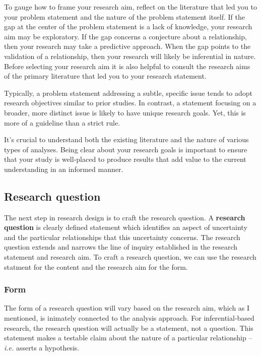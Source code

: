 \documentclass[
  letterpaper,
]{latex/krantz}
\theoremstyle{definition}
\theoremstyle{remark}
\begin{document}
To gauge how to frame your research aim, reflect on the literature that
led you to your problem statement and the nature of the problem
statement itself. If the gap at the center of the problem statement is a
lack of knowledge, your research aim may be exploratory. If the gap
concerns a conjecture about a relationship, then your research may take
a predictive approach. When the gap points to the validation of a
relationship, then your research will likely be inferential in nature.
Before selecting your research aim it is also helpful to consult the
research aims of the primary literature that led you to your research
statement.

Typically, a problem statement addressing a subtle, specific issue tends
to adopt research objectives similar to prior studies. In contrast, a
statement focusing on a broader, more distinct issue is likely to have
unique research goals. Yet, this is more of a guideline than a strict
rule.

It's crucial to understand both the existing literature and the nature
of various types of analyses. Being clear about your research goals is
important to ensure that your study is well-placed to produce results
that add value to the current understanding in an informed manner.

\subsection{Research question}\label{sec-fr-question}

The next step in research design is to craft the research question. A
\textbf{research question} is clearly defined
statement which identifies an aspect of uncertainty and the particular
relationships that this uncertainty concerns. The research question
extends and narrows the line of inquiry established in the research
statement and research aim. To craft a research question, we can use the
research statment for the content and the research aim for the form.

\subsubsection{Form}\label{sec-fr-question-form}

The form of a research question will vary based on the research aim,
which as I mentioned, is inimately connected to the analysis approach.
For inferential-based research, the research question will actually be a
statement, not a question. This statement makes a testable claim about
the nature of a particular relationship --\emph{i.e.} asserts a
hypothesis.
\end{document}
